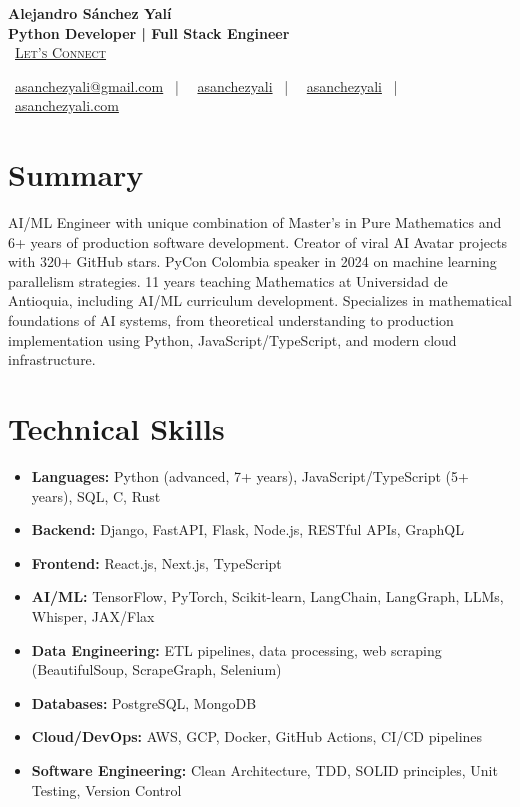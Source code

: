 \documentclass[letterpaper,11pt]{article}
\newcommand{\normalfaCalendar}{{\mdseries\faCalendar}}
\newcommand{\normalfaEnvelope}{{\mdseries\faEnvelope}}
\newcommand{\normalfaLinkedin}{{\mdseries\faLinkedin}}
\newcommand{\normalfaGithub}{{\mdseries\faGithub}}
\newcommand{\normalfaGlobe}{{\mdseries\faGlobe}}
\begin{document}
\begin{center}
\textbf{\Huge Alejandro Sánchez Yalí}\\[0.2em]
\textbf{\Large Python Developer | Full Stack Engineer}\\[0.4em]
\small
\normalfaCalendar\ \href{https://cal.com/asanchezyali/full-time-opportunities}{\textsc{Let's Connect}}

\vspace{0.8em}
\normalfaEnvelope\ \href{mailto:asanchezyali@gmail.com}{asanchezyali@gmail.com}  ~|~
\normalfaLinkedin\ \href{https://www.linkedin.com/in/asanchezyali}{asanchezyali} ~|~
\normalfaGithub\ \href{https://github.com/asanchezyali}{asanchezyali}  ~|~
\normalfaGlobe\ \href{https://asanchezyali.com}{asanchezyali.com}
\end{center}

\section{Summary}
AI/ML Engineer with unique combination of Master's in Pure Mathematics and 6+ years of production software development. Creator of viral AI Avatar projects with 320+ GitHub stars. PyCon Colombia speaker in 2024 on machine learning parallelism strategies. 11 years teaching Mathematics at Universidad de Antioquia, including AI/ML curriculum development. Specializes in mathematical foundations of AI systems, from theoretical understanding to production implementation using Python, JavaScript/TypeScript, and modern cloud infrastructure.

\section{Technical Skills}
\begin{itemize}[leftmargin=*, itemsep=0pt]
  \item \textbf{Languages:} Python (advanced, 7+ years), JavaScript/TypeScript (5+ years), SQL, C, Rust
  \item \textbf{Backend:} Django, FastAPI, Flask, Node.js, RESTful APIs, GraphQL
  \item \textbf{Frontend:} React.js, Next.js, TypeScript
  \item \textbf{AI/ML:} TensorFlow, PyTorch, Scikit-learn, LangChain, LangGraph, LLMs, Whisper, JAX/Flax
  \item \textbf{Data Engineering:} ETL pipelines, data processing, web scraping (BeautifulSoup, ScrapeGraph, Selenium)
  \item \textbf{Databases:} PostgreSQL, MongoDB
  \item \textbf{Cloud/DevOps:} AWS, GCP, Docker, GitHub Actions, CI/CD pipelines
  \item \textbf{Software Engineering:} Clean Architecture, TDD, SOLID principles, Unit Testing, Version Control
\end{itemize}
\end{document}
